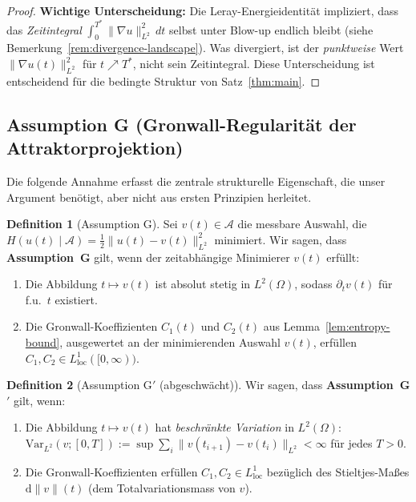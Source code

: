 \documentclass[12pt,a4paper]{article}
\theoremstyle{definition}
\newtheorem{definition}{Definition}[section]
\theoremstyle{plain}
\theoremstyle{remark}
\begin{document}
\begin{proof}
\medskip
\noindent\textbf{Wichtige Unterscheidung:}\;
Die Leray-Energieidentität impliziert, dass das \emph{Zeitintegral}
$\int_0^{T^*}\|\nabla u\|_{L^2}^2\,dt$ selbst unter
Blow-up endlich bleibt (siehe Bemerkung~\ref{rem:divergence-landscape}). Was divergiert,
ist der \emph{punktweise} Wert $\|\nabla u(t)\|_{L^2}^2$ für
$t \nearrow T^*$, nicht sein Zeitintegral. Diese Unterscheidung ist
entscheidend für die bedingte Struktur von Satz~\ref{thm:main}.
\end{proof}

\subsection*{Assumption G (Gronwall-Regularität der Attraktorprojektion)}
\label{sec:assumption-G}

Die folgende Annahme erfasst die zentrale strukturelle Eigenschaft, die unser
Argument benötigt, aber nicht aus ersten Prinzipien herleitet.

\begin{definition}[Assumption G]\label{ass:G}
Sei $v(t) \in \mathcal{A}$ die messbare Auswahl, die
$H(u(t)\mid\mathcal{A}) = \tfrac{1}{2}\|u(t)-v(t)\|_{L^2}^2$ minimiert. Wir sagen,
dass \textbf{Assumption~G} gilt, wenn der zeitabhängige Minimierer $v(t)$ erfüllt:
\begin{enumerate}
    \item[\emph{(G1)}] Die Abbildung $t \mapsto v(t)$ ist absolut stetig in
          $L^2(\Omega)$, sodass $\partial_t v(t)$ für f.u.\ $t$ existiert.
    \item[\emph{(G2)}] Die Gronwall-Koeffizienten $C_1(t)$ und $C_2(t)$ aus
          Lemma~\ref{lem:entropy-bound}, ausgewertet an der minimierenden Auswahl
          $v(t)$, erfüllen $C_1, C_2 \in L^1_{\mathrm{loc}}([0,\infty))$.
\end{enumerate}
\end{definition}

\begin{definition}[Assumption G$'$ (abgeschwächt)]\label{ass:Gprime}
Wir sagen, dass \textbf{Assumption~G$'$} gilt, wenn:
\begin{enumerate}
    \item[\emph{(G1$'$)}] Die Abbildung $t \mapsto v(t)$ hat \emph{beschränkte Variation}
          in $L^2(\Omega)$: $\mathrm{Var}_{L^2}(v; [0,T]) :=
          \sup \sum_{i} \|v(t_{i+1}) - v(t_i)\|_{L^2} < \infty$ für jedes
          $T > 0$.
    \item[\emph{(G2$'$)}] Die Gronwall-Koeffizienten erfüllen
          $C_1, C_2 \in L^1_{\mathrm{loc}}$ bezüglich des Stieltjes-Maßes
          $\mathrm{d}\|v\|(t)$ (dem Totalvariationsmass von $v$).
\end{enumerate}
\end{definition}
\end{document}
